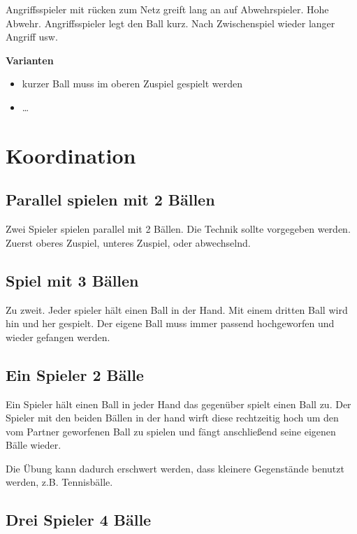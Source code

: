\documentclass[]{book}
\providecommand{\tightlist}{%
  \setlength{\itemsep}{0pt}\setlength{\parskip}{0pt}}
\begin{document}
Angriffsspieler mit rücken zum Netz greift lang an auf Abwehrspieler.
Hohe Abwehr. Angriffsspieler legt den Ball kurz. Nach Zwischenspiel
wieder langer Angriff usw.

\textbf{Varianten}

\begin{itemize}
\tightlist
\item
  kurzer Ball muss im oberen Zuspiel gespielt werden
\item
  \ldots{}
\end{itemize}

\section{Koordination}\label{koordination}

\subsection{Parallel spielen mit 2
Bällen}\label{parallel-spielen-mit-2-ballen}

Zwei Spieler spielen parallel mit 2 Bällen. Die Technik sollte
vorgegeben werden. Zuerst oberes Zuspiel, unteres Zuspiel, oder
abwechselnd.

\subsection{Spiel mit 3 Bällen}\label{spiel-mit-3-ballen}

Zu zweit. Jeder spieler hält einen Ball in der Hand. Mit einem dritten
Ball wird hin und her gespielt. Der eigene Ball muss immer passend
hochgeworfen und wieder gefangen werden.

\subsection{Ein Spieler 2 Bälle}\label{ein-spieler-2-balle}

Ein Spieler hält einen Ball in jeder Hand das gegenüber spielt einen
Ball zu. Der Spieler mit den beiden Bällen in der hand wirft diese
rechtzeitig hoch um den vom Partner geworfenen Ball zu spielen und fängt
anschließend seine eigenen Bälle wieder.

Die Übung kann dadurch erschwert werden, dass kleinere Gegenstände
benutzt werden, z.B. Tennisbälle.

\subsection{Drei Spieler 4 Bälle}\label{drei-spieler-4-balle}
\end{document}

